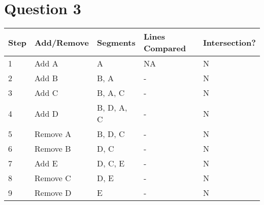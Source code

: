 \documentclass[12pt]{article}
\begin{document}
\section*{Question 3}

\begin{center}
  \begin{tabular}{ | l | l | l | l | l | }
    \hline
    Step & Add/Remove & Segments   & Lines Compared & Intersection? \\ \hline
    1    & Add A       & A          & NA    & N \\ \hline
    2    & Add B       & B, A       & -     & N \\ \hline
    3    & Add C       & B, A, C    & -     & N \\ \hline
    4    & Add D       & B, D, A, C & -     & N \\ \hline
    5    & Remove A    & B, D, C    & -     & N \\ \hline
    6    & Remove B    & D, C       & -     & N \\ \hline
    7    & Add E       & D, C, E    & -     & N \\ \hline
    8    & Remove C    & D, E       & -     & N \\ \hline
    9    & Remove D    & E          & -     & N \\ \hline
  \end{tabular}
\end{center}
\end{document}
